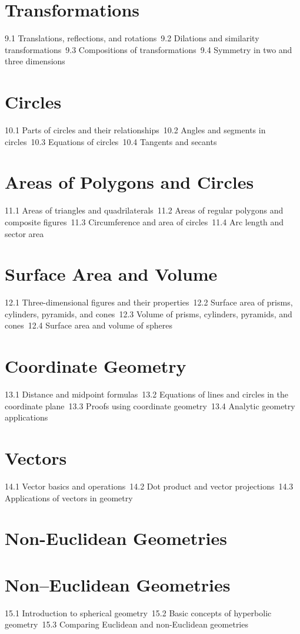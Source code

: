 \section{Transformations}
9.1 Translations, reflections, and rotations\
9.2 Dilations and similarity transformations\
9.3 Compositions of transformations\
9.4 Symmetry in two and three dimensions\
\section{Circles}
10.1 Parts of circles and their relationships\
10.2 Angles and segments in circles\
10.3 Equations of circles\
10.4 Tangents and secants\
\section{Areas of Polygons and Circles}
11.1 Areas of triangles and quadrilaterals\
11.2 Areas of regular polygons and composite figures\
11.3 Circumference and area of circles\
11.4 Arc length and sector area\
\section{Surface Area and Volume}
12.1 Three-dimensional figures and their properties\
12.2 Surface area of prisms, cylinders, pyramids, and cones\
12.3 Volume of prisms, cylinders, pyramids, and cones\
12.4 Surface area and volume of spheres\
\section{Coordinate Geometry}
13.1 Distance and midpoint formulas\
13.2 Equations of lines and circles in the coordinate plane\
13.3 Proofs using coordinate geometry\
13.4 Analytic geometry applications\
\section{Vectors}
14.1 Vector basics and operations\
14.2 Dot product and vector projections\
14.3 Applications of vectors in geometry\
\section{Non-Euclidean Geometries}
\section{Non–Euclidean Geometries}
15.1 Introduction to spherical geometry\
15.2 Basic concepts of hyperbolic geometry\
15.3 Comparing Euclidean and non-Euclidean geometries\
